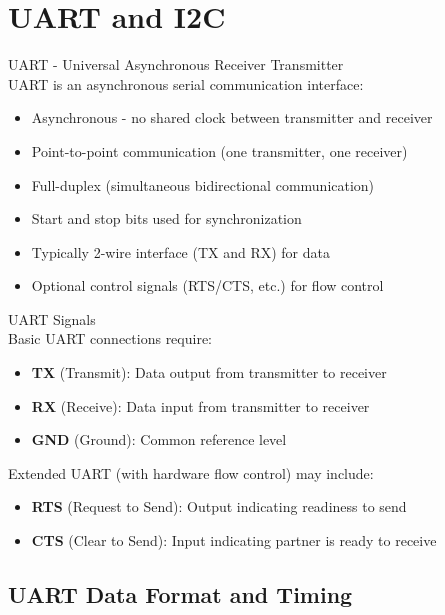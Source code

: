 
\section{UART and I2C}


\begin{concept}{UART - Universal Asynchronous Receiver Transmitter}\\
UART is an asynchronous serial communication interface:
\begin{itemize}
    \item Asynchronous - no shared clock between transmitter and receiver
    \item Point-to-point communication (one transmitter, one receiver)
    \item Full-duplex (simultaneous bidirectional communication)
    \item Start and stop bits used for synchronization
    \item Typically 2-wire interface (TX and RX) for data
    \item Optional control signals (RTS/CTS, etc.) for flow control
\end{itemize}
\end{concept}

\begin{definition}{UART Signals}\\
Basic UART connections require:
\begin{itemize}
    \item \textbf{TX} (Transmit): Data output from transmitter to receiver
    \item \textbf{RX} (Receive): Data input from transmitter to receiver
    \item \textbf{GND} (Ground): Common reference level
\end{itemize}
Extended UART (with hardware flow control) may include:
\begin{itemize}
    \item \textbf{RTS} (Request to Send): Output indicating readiness to send
    \item \textbf{CTS} (Clear to Send): Input indicating partner is ready to receive
\end{itemize}
\end{definition}

\multend

\subsection{UART Data Format and Timing}

